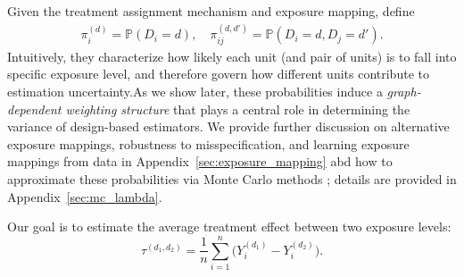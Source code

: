 \documentclass[twoside,letterpaper]{article}
\theoremstyle{plain}
\theoremstyle{definition}
\theoremstyle{remark}
\newcommand{\bY}{\boldsymbol{Y}}
\newcommand{\bZero}{\boldsymbol{0}}
\begin{document}
Given the treatment assignment mechanism and exposure mapping, define 
\begin{align}\label{eq::exposure-probabilities}
\pi_i^{(d)} = \mathbb{P}(D_i = d), \quad
\pi_{ij}^{(d,d')} = \mathbb{P}(D_i = d, D_j = d').
\end{align}
 Intuitively, they characterize how likely each unit (and pair of units) is to fall into specific exposure level, and therefore govern how different units contribute to estimation uncertainty.As we show later, these probabilities induce a \emph{graph-dependent weighting structure} that plays a central role in determining the variance of design-based estimators. We provide further discussion on alternative exposure mappings, robustness to misspecification, and learning exposure mappings from data in Appendix~\ref{sec:exposure_mapping} abd  
how to approximate these probabilities via Monte Carlo methods \citep{aronow2017estimating}; details are provided in Appendix~\ref{sec:mc_lambda}.

Our goal is to estimate the average treatment effect between two exposure levels:
\[
\tau^{(d_1,d_2)} = \frac{1}{n} \sum_{i=1}^n \bigl( Y_i^{(d_1)} - Y_i^{(d_2)} \bigr).
\]



\end{document}
